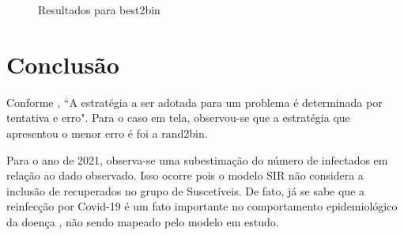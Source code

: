 \documentclass[]{article}
\begin{document}
\begin{figure}[h!]
	\centering
	
	
	\caption{Resultados para best2bin}
	\label{res08}
\end{figure}

\section{Conclusão}
Conforme \cite{Barcelos2011}, ``A estratégia a ser adotada para um problema é determinada por tentativa e erro". Para o caso em tela, observou-se que a estratégia que apresentou o menor erro é foi a rand2bin. 

Para o ano de 2021, observa-se uma subestimação do número de infectados em relação ao dado observado. Isso ocorre pois o modelo SIR não considera a inclusão de recuperados no grupo de Suscetíveis. De fato, já se sabe que a reinfecção por Covid-19  é um fato importante no comportamento epidemiológico da doença \cite{Silva2021}, não sendo mapeado pelo modelo em estudo. 

 
 
\end{document}
